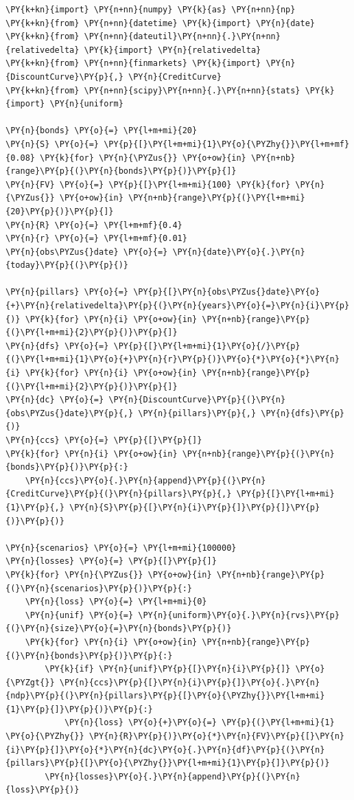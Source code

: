 \begin{tcolorbox}[breakable, size=fbox, boxrule=1pt, pad at break*=1mm,colback=cellbackground, colframe=cellborder]
\begin{Verbatim}[commandchars=\\\{\}]
\PY{k+kn}{import} \PY{n+nn}{numpy} \PY{k}{as} \PY{n+nn}{np}
\PY{k+kn}{from} \PY{n+nn}{datetime} \PY{k}{import} \PY{n}{date}
\PY{k+kn}{from} \PY{n+nn}{dateutil}\PY{n+nn}{.}\PY{n+nn}{relativedelta} \PY{k}{import} \PY{n}{relativedelta}
\PY{k+kn}{from} \PY{n+nn}{finmarkets} \PY{k}{import} \PY{n}{DiscountCurve}\PY{p}{,} \PY{n}{CreditCurve}
\PY{k+kn}{from} \PY{n+nn}{scipy}\PY{n+nn}{.}\PY{n+nn}{stats} \PY{k}{import} \PY{n}{uniform}
		
\PY{n}{bonds} \PY{o}{=} \PY{l+m+mi}{20}
\PY{n}{S} \PY{o}{=} \PY{p}{[}\PY{l+m+mi}{1}\PY{o}{\PYZhy{}}\PY{l+m+mf}{0.08} \PY{k}{for} \PY{n}{\PYZus{}} \PY{o+ow}{in} \PY{n+nb}{range}\PY{p}{(}\PY{n}{bonds}\PY{p}{)}\PY{p}{]}
\PY{n}{FV} \PY{o}{=} \PY{p}{[}\PY{l+m+mi}{100} \PY{k}{for} \PY{n}{\PYZus{}} \PY{o+ow}{in} \PY{n+nb}{range}\PY{p}{(}\PY{l+m+mi}{20}\PY{p}{)}\PY{p}{]}
\PY{n}{R} \PY{o}{=} \PY{l+m+mf}{0.4}
\PY{n}{r} \PY{o}{=} \PY{l+m+mf}{0.01}
\PY{n}{obs\PYZus{}date} \PY{o}{=} \PY{n}{date}\PY{o}{.}\PY{n}{today}\PY{p}{(}\PY{p}{)}
		
\PY{n}{pillars} \PY{o}{=} \PY{p}{[}\PY{n}{obs\PYZus{}date}\PY{o}{+}\PY{n}{relativedelta}\PY{p}{(}\PY{n}{years}\PY{o}{=}\PY{n}{i}\PY{p}{)} \PY{k}{for} \PY{n}{i} \PY{o+ow}{in} \PY{n+nb}{range}\PY{p}{(}\PY{l+m+mi}{2}\PY{p}{)}\PY{p}{]}
\PY{n}{dfs} \PY{o}{=} \PY{p}{[}\PY{l+m+mi}{1}\PY{o}{/}\PY{p}{(}\PY{l+m+mi}{1}\PY{o}{+}\PY{n}{r}\PY{p}{)}\PY{o}{*}\PY{o}{*}\PY{n}{i} \PY{k}{for} \PY{n}{i} \PY{o+ow}{in} \PY{n+nb}{range}\PY{p}{(}\PY{l+m+mi}{2}\PY{p}{)}\PY{p}{]}
\PY{n}{dc} \PY{o}{=} \PY{n}{DiscountCurve}\PY{p}{(}\PY{n}{obs\PYZus{}date}\PY{p}{,} \PY{n}{pillars}\PY{p}{,} \PY{n}{dfs}\PY{p}{)}
\PY{n}{ccs} \PY{o}{=} \PY{p}{[}\PY{p}{]}
\PY{k}{for} \PY{n}{i} \PY{o+ow}{in} \PY{n+nb}{range}\PY{p}{(}\PY{n}{bonds}\PY{p}{)}\PY{p}{:}
    \PY{n}{ccs}\PY{o}{.}\PY{n}{append}\PY{p}{(}\PY{n}{CreditCurve}\PY{p}{(}\PY{n}{pillars}\PY{p}{,} \PY{p}{[}\PY{l+m+mi}{1}\PY{p}{,} \PY{n}{S}\PY{p}{[}\PY{n}{i}\PY{p}{]}\PY{p}{]}\PY{p}{)}\PY{p}{)}
		
\PY{n}{scenarios} \PY{o}{=} \PY{l+m+mi}{100000}
\PY{n}{losses} \PY{o}{=} \PY{p}{[}\PY{p}{]}
\PY{k}{for} \PY{n}{\PYZus{}} \PY{o+ow}{in} \PY{n+nb}{range}\PY{p}{(}\PY{n}{scenarios}\PY{p}{)}\PY{p}{:}
    \PY{n}{loss} \PY{o}{=} \PY{l+m+mi}{0}
    \PY{n}{unif} \PY{o}{=} \PY{n}{uniform}\PY{o}{.}\PY{n}{rvs}\PY{p}{(}\PY{n}{size}\PY{o}{=}\PY{n}{bonds}\PY{p}{)}
    \PY{k}{for} \PY{n}{i} \PY{o+ow}{in} \PY{n+nb}{range}\PY{p}{(}\PY{n}{bonds}\PY{p}{)}\PY{p}{:}
        \PY{k}{if} \PY{n}{unif}\PY{p}{[}\PY{n}{i}\PY{p}{]} \PY{o}{\PYZgt{}} \PY{n}{ccs}\PY{p}{[}\PY{n}{i}\PY{p}{]}\PY{o}{.}\PY{n}{ndp}\PY{p}{(}\PY{n}{pillars}\PY{p}{[}\PY{o}{\PYZhy{}}\PY{l+m+mi}{1}\PY{p}{]}\PY{p}{)}\PY{p}{:}
            \PY{n}{loss} \PY{o}{+}\PY{o}{=} \PY{p}{(}\PY{l+m+mi}{1} \PY{o}{\PYZhy{}} \PY{n}{R}\PY{p}{)}\PY{o}{*}\PY{n}{FV}\PY{p}{[}\PY{n}{i}\PY{p}{]}\PY{o}{*}\PY{n}{dc}\PY{o}{.}\PY{n}{df}\PY{p}{(}\PY{n}{pillars}\PY{p}{[}\PY{o}{\PYZhy{}}\PY{l+m+mi}{1}\PY{p}{]}\PY{p}{)} 
        \PY{n}{losses}\PY{o}{.}\PY{n}{append}\PY{p}{(}\PY{n}{loss}\PY{p}{)}
        

\end{Verbatim}
\end{tcolorbox}
